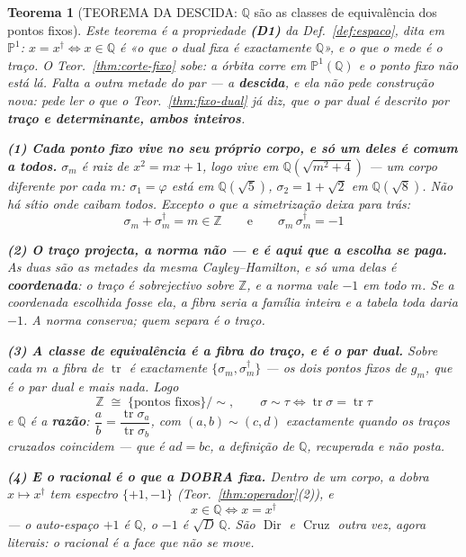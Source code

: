\documentclass[11pt,a4paper]{article}
\newtheorem{teorema}{Teorema}
\newcommand{\dg}{^{\dagger}}
\begin{document}
\begin{teorema}[TEOREMA DA DESCIDA: $\mathbb{Q}$ são as classes de equivalência dos pontos
fixos]\label{thm:descida}
\emph{Este teorema é a propriedade} \textbf{(D1)} \emph{da Def.~\ref{def:espaco}, dita em
$\mathbb{P}^1$}: $x=x\dg\iff x\in\mathbb{Q}$ é «o que o dual fixa é exactamente
$\mathbb{Q}$», e o que o mede é o traço.
O Teor.~\ref{thm:corte-fixo} sobe: a órbita corre em $\mathbb{P}^1(\mathbb{Q})$ e o ponto
fixo \emph{não está lá}. Falta a outra metade do par --- a \textbf{descida}, e ela não pede
construção nova: pede ler o que o Teor.~\ref{thm:fixo-dual} já diz, que o par dual é
descrito por \textbf{traço e determinante, ambos inteiros}.

\textbf{(1) Cada ponto fixo vive no seu próprio corpo, e só um deles é comum a todos.}
$\sigma_m$ é raiz de $x^{2}=mx+1$, logo vive em $\mathbb{Q}(\sqrt{m^{2}+4})$ --- um corpo
\emph{diferente} por cada $m$: $\sigma_1=\varphi$ está em $\mathbb{Q}(\sqrt5)$,
$\sigma_2=1+\sqrt2$ em $\mathbb{Q}(\sqrt8)$. Não há sítio onde caibam todos. \emph{Excepto
o que a simetrização deixa para trás:}
\[
\boxed{\;\sigma_m+\sigma_m\dg=m\in\mathbb{Z}
\qquad\text{e}\qquad
\sigma_m\,\sigma_m\dg=-1\;}
\]

\textbf{(2) O traço projecta, a norma não --- e é aqui que a escolha se paga.} As duas são
as metades da mesma Cayley--Hamilton, e só uma delas é \textbf{coordenada}: o traço é
sobrejectivo sobre $\mathbb{Z}$, e a norma \emph{vale $-1$ em todo $m$}. Se a coordenada
escolhida fosse ela, a fibra seria a família inteira e a tabela toda daria $-1$. \emph{A
norma conserva; quem separa é o traço.}

\textbf{(3) A classe de equivalência é a fibra do traço, e é o par dual.} Sobre cada $m$ a
fibra de $\operatorname{tr}$ é exactamente $\{\sigma_m,\sigma_m\dg\}$ --- os dois pontos
fixos de $g_m$, que é o par dual e mais nada. Logo
\[
\boxed{\;\mathbb{Z}\;\cong\;\{\text{pontos fixos}\}\big/\!\sim,
\qquad \sigma\sim\tau\iff\operatorname{tr}\sigma=\operatorname{tr}\tau\;}
\]
e $\mathbb{Q}$ é a \textbf{razão}: $\dfrac ab=\dfrac{\operatorname{tr}\sigma_a}
{\operatorname{tr}\sigma_b}$, com $(a,b)\sim(c,d)$ exactamente quando os traços cruzados
coincidem --- que é $ad=bc$, a definição de $\mathbb{Q}$, \emph{recuperada e não posta}.

\textbf{(4) E o racional é o que a DOBRA fixa.} Dentro de um corpo, a dobra $x\mapsto
x\dg$ tem espectro $\{+1,-1\}$ (Teor.~\ref{thm:operador}(2)), e
\[
\boxed{\;x\in\mathbb{Q}\iff x=x\dg\;}
\]
--- o auto-espaço $+1$ \emph{é} $\mathbb{Q}$, o $-1$ é $\sqrt D\,\mathbb{Q}$. São
$\operatorname{Dir}$ e $\operatorname{Cruz}$ outra vez, agora literais: \emph{o racional é
a face que não se move.}


\end{teorema}
\end{document}
